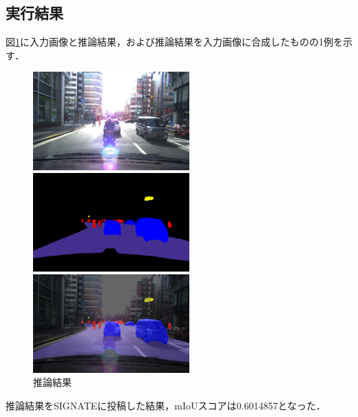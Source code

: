 \subsection{実行結果}
図\ref{estimate_result}に入力画像と推論結果，および推論結果を入力画像に合成したものの1例を示す．
\begin{figure}[b]
    \label{estimate_result}
    \caption{推論結果}
    \begin{minipage}{0.33\hsize}
     \begin{center}
      \includegraphics[width=60mm]{./figures/orig.jpg}
     \end{center}
    \end{minipage}
    \begin{minipage}{0.33\hsize}
     \begin{center}
      \includegraphics[width=60mm]{./figures/label.png}
     \end{center}
    \end{minipage}
    \begin{minipage}{0.33\hsize}
        \begin{center}
         \includegraphics[width=60mm]{./figures/mixed.png}
        \end{center}
       \end{minipage}   
   \end{figure}
推論結果をSIGNATEに投稿した結果，mIoUスコアは0.6014857となった．

